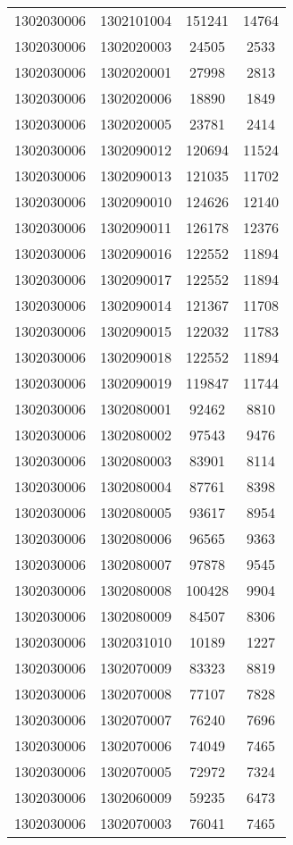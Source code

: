 \begin{longtable}[h]{llcc}
		1302030006 & 1302101004 & 151241 & 14764\\
		1302030006 & 1302020003 & 24505 & 2533\\
		1302030006 & 1302020001 & 27998 & 2813\\
		1302030006 & 1302020006 & 18890 & 1849\\
		1302030006 & 1302020005 & 23781 & 2414\\
		1302030006 & 1302090012 & 120694 & 11524\\
		1302030006 & 1302090013 & 121035 & 11702\\
		1302030006 & 1302090010 & 124626 & 12140\\
		1302030006 & 1302090011 & 126178 & 12376\\
		1302030006 & 1302090016 & 122552 & 11894\\
		1302030006 & 1302090017 & 122552 & 11894\\
		1302030006 & 1302090014 & 121367 & 11708\\
		1302030006 & 1302090015 & 122032 & 11783\\
		1302030006 & 1302090018 & 122552 & 11894\\
		1302030006 & 1302090019 & 119847 & 11744\\
		1302030006 & 1302080001 & 92462 & 8810\\
		1302030006 & 1302080002 & 97543 & 9476\\
		1302030006 & 1302080003 & 83901 & 8114\\
		1302030006 & 1302080004 & 87761 & 8398\\
		1302030006 & 1302080005 & 93617 & 8954\\
		1302030006 & 1302080006 & 96565 & 9363\\
		1302030006 & 1302080007 & 97878 & 9545\\
		1302030006 & 1302080008 & 100428 & 9904\\
		1302030006 & 1302080009 & 84507 & 8306\\
		1302030006 & 1302031010 & 10189 & 1227\\
		1302030006 & 1302070009 & 83323 & 8819\\
		1302030006 & 1302070008 & 77107 & 7828\\
		1302030006 & 1302070007 & 76240 & 7696\\
		1302030006 & 1302070006 & 74049 & 7465\\
		1302030006 & 1302070005 & 72972 & 7324\\
		1302030006 & 1302060009 & 59235 & 6473\\
		1302030006 & 1302070003 & 76041 & 7465\\

\end{longtable}
